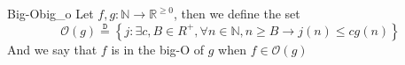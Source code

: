 \begin{definition}{Big-O}{big_o}
Let $ f, g: \mathbb{N} \to  \mathbb{R} ^{ \ge 0 }  $, then we define the set 
\[
    \mathcal{ O } \left( g \right) \stackrel{\mathtt{D}}{=}  \left\{ j: \exists c, B \in  R ^{ +  }, \forall n \in \mathbb{N} , n \ge B \rightarrow j\left( n \right) \le c g\left( n \right)    \right\} 
\]
And we say that $ f $ is in the big-O of $ g $ when $ f \in  \mathcal{ O } \left( g \right)  $ 
\end{definition}
